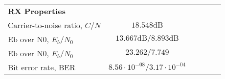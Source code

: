\begin{table}[htbp]
\begin{tabular}{lccccr}
    \rowcolor[rgb]{ 0,  0,  0} \textcolor[rgb]{ 1,  1,  1}{\textbf{RX Properties}}	& \textcolor[rgb]{ 1,  1,  1}{\textbf{}} 		\\
    Carrier-to-noise ratio, $C/N$ 					& $18.548 \text{dB}$										\\
    Eb over N0, $E_b/N_0$ 					& $13.667 \text{dB} / 8.893 \text{dB}$					\\
    Eb over N0, $E_b/N_0$ 					& $23.262 / 7.749$									\\
    Bit error rate, BER							& $8.56\cdot 10^{-08} / 3.17\cdot 10^{-04}$ 				\\
    \end{tabular}
  \label{tab:link_budget}

\end{table}
